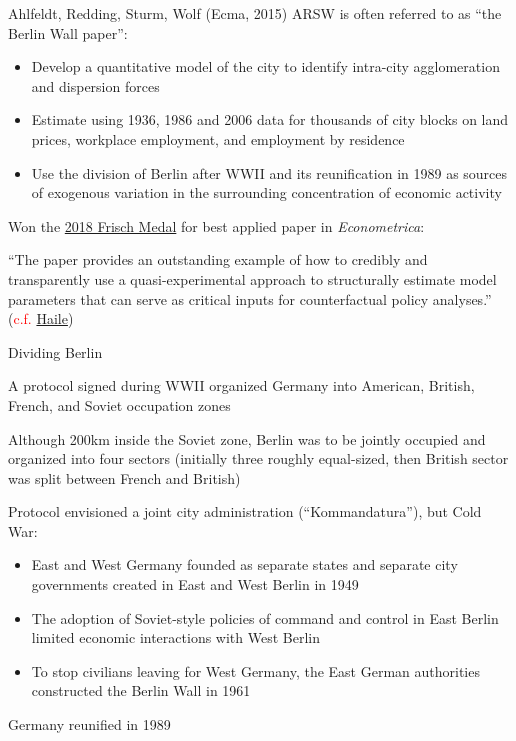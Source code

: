 \documentclass[11pt,notes=hide,aspectratio=169]{beamer}
\begin{document}
\begin{frame}{Ahlfeldt, Redding, Sturm, Wolf (Ecma, 2015)}
ARSW is often referred to as ``the Berlin Wall paper'':
\begin{itemize}
\item Develop a quantitative model of the city to identify intra-city agglomeration and dispersion forces
\item Estimate using 1936, 1986 and 2006 data for thousands of city blocks on land prices, workplace employment, and employment by residence
\item Use the division of Berlin after WWII and its reunification in 1989 as sources of exogenous variation in the surrounding concentration of economic activity
\end{itemize}
Won the \href{https://www.econometricsociety.org/society/awards}{2018 Frisch Medal} for best applied paper in \textit{Econometrica}:
{\small ``The paper provides an outstanding example of how to credibly and transparently use a quasi-experimental approach to structurally estimate model parameters that can serve as critical inputs for counterfactual policy analyses.''
(\textcolor{red}{c.f.} \href{https://www.dropbox.com/s/8kwtwn30dyac18s/intro.pdf?dl=0}{Haile})\par}
\end{frame}
\begin{frame}{Dividing Berlin}
\begin{itemize}
{\small
\item A protocol signed during WWII organized Germany into American, British, French, and Soviet occupation zones
\item Although 200km inside the Soviet zone, Berlin was to be jointly occupied and organized into four sectors (initially three roughly equal-sized, then British sector was split between French and British)
\item Protocol envisioned a joint city administration (``Kommandatura''), but Cold War:
	\begin{itemize}
	\item East and West Germany founded as separate states and separate city governments created in East and West Berlin in 1949
	\item The adoption of Soviet-style policies of command and control in East Berlin limited economic interactions with West Berlin
	\item To stop civilians leaving for West Germany, the East German authorities constructed the Berlin Wall in 1961
	\end{itemize}
\item Germany reunified in 1989
}
\end{itemize}
\end{frame}
\end{document}
